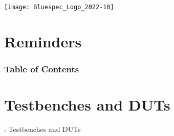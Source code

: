 


\date{L11: {\BSV}: Verifiying BSV Designs}





\begin{frame}
\titlepage

\begin{center}
 \texttt{[image: Bluespec\_Logo\_2022-10]}
\end{center}

\end{frame}


\section{Reminders}




\begin{frame}
\frametitle{Table of Contents}

\tableofcontents

\end{frame}


\section{Testbenches and DUTs}

\begin{frame}

\begin{center}
  {\LARGE {\BSV}: Testbenches and DUTs}
\end{center}

\end{frame}


